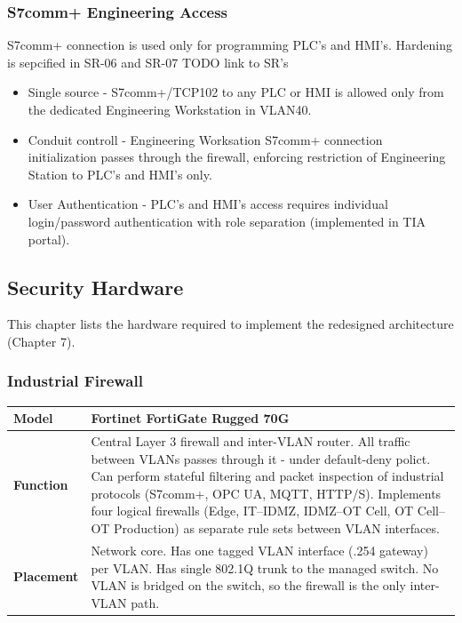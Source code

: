 \subsubsection{S7comm+ Engineering Access}
S7comm+ connection is used only for programming PLC's and HMI's. Hardening is sepcified in SR-06 and SR-07 TODO link to SR's
\begin{itemize}
    \item Single source - S7comm+/TCP102 to any PLC or HMI is allowed only from the dedicated Engineering Workstation in VLAN40.
    \item Conduit controll - Engineering Worksation S7comm+ connection initialization passes through the firewall, enforcing restriction of Engineering Station to PLC's and HMI's only.
    \item User Authentication - PLC's and HMI's access requires individual login/password authentication with role separation (implemented in TIA portal).
\end{itemize}



\subsection{Security Hardware}
This chapter lists the hardware required to implement the redesigned architecture (Chapter 7). 

\subsubsection{Industrial Firewall}

\renewcommand{\arraystretch}{1.3} %
\begin{tabularx}{\textwidth}{>{\bfseries}p{2.5cm} X}
    \toprule
    Model & Fortinet FortiGate Rugged 70G \\
    \midrule
    Function & Central Layer 3 firewall and inter-VLAN router. All traffic between VLANs passes through it - under default-deny polict. 
    Can perform stateful filtering and packet inspection of industrial protocols (S7comm+, OPC UA, MQTT, HTTP/S). Implements four logical firewalls 
    (Edge, IT–IDMZ, IDMZ–OT Cell, OT Cell–OT Production) as separate rule sets between VLAN interfaces. \\
    \midrule
    Placement & Network core. Has one tagged VLAN interface (.254 gateway) per VLAN. Has single 802.1Q trunk to the managed switch. No VLAN is bridged on the switch, so the firewall is the only inter-VLAN path. \\
    \midrule
\end{tabularx}

